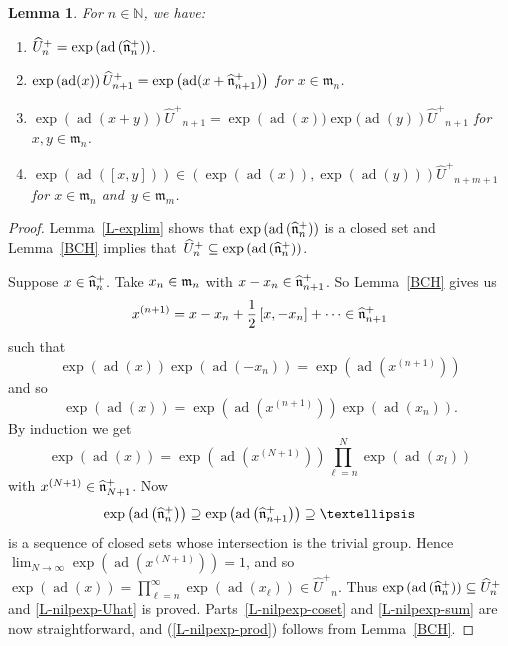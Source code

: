 \documentclass[11pt,letterpaper]{amsart}
\newcounter{thecounter}
\numberwithin{thecounter}{section}
\newtheorem{lemma}[thecounter]{Lemma}
\theoremstyle{definition}
\DeclareMathOperator{\ad}{ad}
\newcommand{\N}{{\mathbb N}}
\newcommand{\Uhp}{{\widehat{U}^+}}
\begin{document}
\begin{lemma}\label{L-nilpexp}   For $n\in\N$, we have: 
\begin{enumerate}
\item\label{L-nilpexp-Uhat}  $\Uhp_n=\exp\left(\ad\left(\widehat{\frak n}^+_n\right)\right)$.
\item\label{L-nilpexp-coset}  $\exp\left(\ad(x)\right) \Uhp_{n+1} = \exp\left(\ad(x + \widehat{\frak n}^+_{n+1})\right)$ for $x\in\mathfrak{m}_n$.
\item\label{L-nilpexp-sum}  $\exp\left(\ad(x+y)\right) \Uhp_{n+1} = \exp\left(\ad(x))\exp(\ad(y)\right) \Uhp_{n+1}$ for $x,y\in\mathfrak{m}_n$.
\item\label{L-nilpexp-prod} 
  $\exp\left(\ad\left([x,y]\right)\right) \in \left( \exp\left(\ad(x)\right), \exp\left(\ad(y)\right) \right)\Uhp_{n+m+1}$ for $x\in\mathfrak{m}_n$ and~$y\in\mathfrak{m}_m$.
\end{enumerate}
\end{lemma}

\begin{longver}
\begin{proof}
Lemma~\ref{L-explim} shows that $\exp\left(\ad\left(\widehat{\frak n}^+_n\right)\right)$ is a closed set and Lemma~\ref{BCH} implies that~$\Uhp_n\subseteq\exp\left(\ad\left(\widehat{\frak n}^+_n\right)\right)$. 

Suppose $x\in\widehat{\frak n}^+_n$. Take  $x_n\in\frak{m}_n$ with $x-x_n\in\widehat{\frak n}^+_{n+1}$.
So Lemma~\ref{BCH} gives us  $$x^{(n+1)} = x-x_n+ \frac{1}{2}\left[x,-x_n\right]+\cdots\in\widehat{\frak n}^+_{n+1}$$ such that
$$\exp\left(\ad\left(x\right)\right) \exp\left(\ad\left(-x_n\right)\right)= \exp\left(\ad\left(x^{(n+1)}\right)\right)$$
and so
$$\exp\left(\ad\left(x\right)\right)= \exp\left(\ad\left(x^{(n+1)}\right)\right) \exp\left(\ad\left(x_n\right)\right).$$
By induction we get
$$\exp\left(\ad(x)\right)= \exp\left(\ad\left(x^{(N+1)}\right)\right) \prod_{\ell=n}^N\exp\left(\ad\left(x_l\right)\right) $$
with $x^{(N+1)}\in\widehat{\frak n}^+_{N+1}$.
Now
$$\exp\left(\ad\left({\widehat{\frak n}}^+_n\right)\right) \supseteq \exp\left(\ad\left({\widehat{\frak n}}^+_{n+1}\right)\right)\supseteq \dots$$
is a sequence of closed sets whose intersection is the trivial group.
Hence $\lim_{N\to\infty}\exp\left(\ad\left(x^{(N+1)}\right)\right)=1$, and so $\exp\left(\ad(x)\right)=\prod_{\ell=n}^\infty\exp\left(\ad\left(x_\ell\right)\right)\in \Uhp_n.$
Thus $\exp\left(\ad\left(\widehat{\frak n}^+_n\right)\right) \subseteq \Uhp_n$ and \eqref{L-nilpexp-Uhat} is proved. 
Parts~\eqref{L-nilpexp-coset} and \eqref{L-nilpexp-sum} are now straightforward, and (\ref{L-nilpexp-prod}) follows from Lemma~\ref{BCH}.
\end{proof}
\end{longver}
\end{document}
